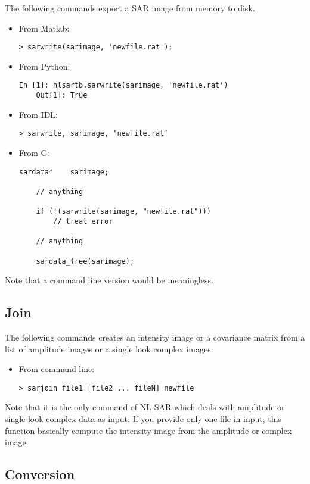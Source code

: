 \documentclass[10pt,french,english,a4paper]{article}
\begin{document}
The following commands export a SAR image from memory to disk.
\begin{itemize}
\item From Matlab:
  \begin{Verbatim}[frame=single]
    > sarwrite(sarimage, 'newfile.rat');
  \end{Verbatim}
\item From Python:
  \begin{Verbatim}[frame=single]
    In [1]: nlsartb.sarwrite(sarimage, 'newfile.rat')
    Out[1]: True
  \end{Verbatim}
\item From IDL:
  \begin{Verbatim}[frame=single]
    > sarwrite, sarimage, 'newfile.rat'
  \end{Verbatim}
\item From C:
  \begin{Verbatim}[frame=single]
    sardata*    sarimage;

    // anything

    if (!(sarwrite(sarimage, "newfile.rat")))
        // treat error

    // anything

    sardata_free(sarimage);
  \end{Verbatim}
\end{itemize}

Note that a command line version would be meaningless.

\subsection{Join}
\label{sec:join}

The following commands creates an intensity image
or a covariance matrix from a list of amplitude images or
a single look complex images:
\begin{itemize}
\item From command line:
  \begin{Verbatim}[frame=single]
    > sarjoin file1 [file2 ... fileN] newfile
  \end{Verbatim}
\end{itemize}

Note that it is the only command of NL-SAR which deals
with amplitude or single look complex data as input. If you provide
only one file in input, this function basically compute
the intensity image from the amplitude or complex image.

\subsection{Conversion}
\label{sec:convert}
\end{document}
